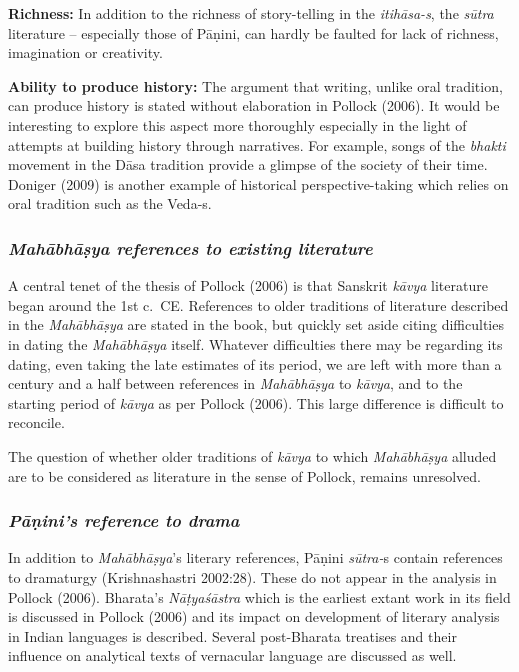 {\bf Richness:} In addition to the richness of story-telling in the {\sl itihāsa-s}, the {\sl sūtra} literature – especially those of Pāṇini, can hardly be faulted for lack of richness, imagination or creativity.

{\bf Ability to produce history:} The argument that writing, unlike oral tradition, can produce history is stated without elaboration in Pollock (2006). It would be interesting to explore this aspect more thoroughly especially in the light of attempts at building history through narratives. For example, songs of the {\sl bhakti} movement in the Dāsa tradition provide a glimpse of the society of their time. Doniger (2009) is another example of historical perspective-taking which relies on oral tradition such as the Veda-s.
\newpage

\subsubsection{{\sl Mahābhāṣya references to existing literature}}

A central tenet of the thesis of Pollock (2006) is that Sanskrit {\sl kāvya} literature began around the 1st c.\ CE\@. References to older traditions of literature described in the {\sl Mahābhāṣya} are stated in the book, but quickly set aside citing difficulties in dating the {\sl Mahābhāṣya} itself. Whatever difficulties there may be regarding its dating, even taking the late estimates of its period, we are left with more than a century and a half between references in {\sl Mahābhāṣya} to {\sl kāvya}, and to the starting period of {\sl kāvya} as per Pollock (2006). This large difference is difficult to reconcile. 

The question of whether older traditions of {\sl kāvya} to which {\sl Mahābhāṣya} alluded are to be considered as literature in the sense of Pollock, remains unresolved.

\subsubsection{{\sl Pāṇini’s reference to drama}}

In addition to {\sl Mahābhāṣya}’s literary references, Pāṇini {\sl sūtra-}s contain references to dramaturgy (Krishnashastri 2002:28). These do not appear in the analysis in Pollock (2006). Bharata’s {\sl Nāṭyaśāstra} which is the earliest extant work in its field is discussed in Pollock (2006) and its impact on development of literary analysis in Indian languages is described. Several post-Bharata treatises and their influence on analytical texts of vernacular language are discussed as well.

